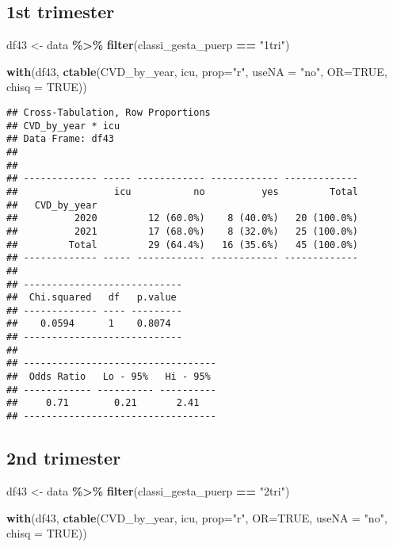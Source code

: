 \documentclass[
]{article}
\newenvironment{Shaded}{\begin{snugshade}}{\end{snugshade}}
\newcommand{\AttributeTok}[1]{\textcolor[rgb]{0.13,0.29,0.53}{#1}}
\newcommand{\ConstantTok}[1]{\textcolor[rgb]{0.56,0.35,0.01}{#1}}
\newcommand{\FunctionTok}[1]{\textcolor[rgb]{0.13,0.29,0.53}{\textbf{#1}}}
\newcommand{\NormalTok}[1]{#1}
\newcommand{\OtherTok}[1]{\textcolor[rgb]{0.56,0.35,0.01}{#1}}
\newcommand{\SpecialCharTok}[1]{\textcolor[rgb]{0.81,0.36,0.00}{\textbf{#1}}}
\newcommand{\StringTok}[1]{\textcolor[rgb]{0.31,0.60,0.02}{#1}}
\begin{document}
\hypertarget{st-trimester-6}{%
\subsection{1st trimester}\label{st-trimester-6}}

\begin{Shaded}
\begin{Highlighting}[]
\NormalTok{df43 }\OtherTok{\textless{}{-}}\NormalTok{ data }\SpecialCharTok{\%\textgreater{}\%} 
  \FunctionTok{filter}\NormalTok{(classi\_gesta\_puerp }\SpecialCharTok{==} \StringTok{"1tri"}\NormalTok{)}

\FunctionTok{with}\NormalTok{(df43, }\FunctionTok{ctable}\NormalTok{(CVD\_by\_year, icu, }\AttributeTok{prop=}\StringTok{"r"}\NormalTok{, }\AttributeTok{useNA =} \StringTok{"no"}\NormalTok{, }\AttributeTok{OR=}\ConstantTok{TRUE}\NormalTok{, }\AttributeTok{chisq =} \ConstantTok{TRUE}\NormalTok{))}
\end{Highlighting}
\end{Shaded}

\begin{verbatim}
## Cross-Tabulation, Row Proportions  
## CVD_by_year * icu  
## Data Frame: df43  
## 
## 
## ------------- ----- ------------ ------------ -------------
##                 icu           no          yes         Total
##   CVD_by_year                                              
##          2020         12 (60.0%)    8 (40.0%)   20 (100.0%)
##          2021         17 (68.0%)    8 (32.0%)   25 (100.0%)
##         Total         29 (64.4%)   16 (35.6%)   45 (100.0%)
## ------------- ----- ------------ ------------ -------------
## 
## ----------------------------
##  Chi.squared   df   p.value 
## ------------- ---- ---------
##    0.0594      1    0.8074  
## ----------------------------
## 
## ----------------------------------
##  Odds Ratio   Lo - 95%   Hi - 95% 
## ------------ ---------- ----------
##     0.71        0.21       2.41   
## ----------------------------------
\end{verbatim}

\hypertarget{nd-trimester-6}{%
\subsection{2nd trimester}\label{nd-trimester-6}}

\begin{Shaded}
\begin{Highlighting}[]
\NormalTok{df43 }\OtherTok{\textless{}{-}}\NormalTok{ data }\SpecialCharTok{\%\textgreater{}\%} 
  \FunctionTok{filter}\NormalTok{(classi\_gesta\_puerp }\SpecialCharTok{==} \StringTok{"2tri"}\NormalTok{)}

\FunctionTok{with}\NormalTok{(df43, }\FunctionTok{ctable}\NormalTok{(CVD\_by\_year, icu, }\AttributeTok{prop=}\StringTok{"r"}\NormalTok{, }\AttributeTok{OR=}\ConstantTok{TRUE}\NormalTok{, }\AttributeTok{useNA =} \StringTok{"no"}\NormalTok{, }\AttributeTok{chisq =} \ConstantTok{TRUE}\NormalTok{))}
\end{Highlighting}
\end{Shaded}
\end{document}
